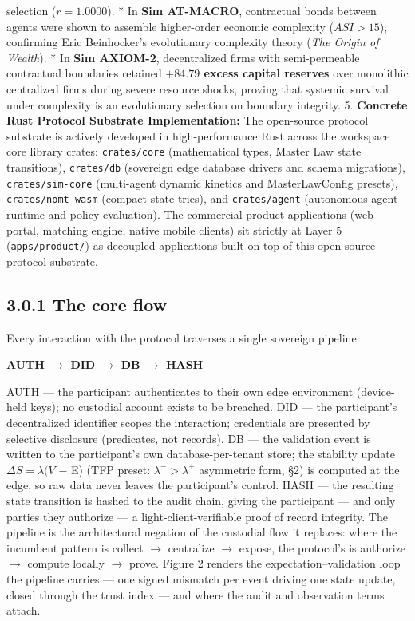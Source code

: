 \documentclass[
]{article}
\begin{document}
selection (\(r = 1.0000\)). * In \textbf{Sim AT-MACRO}, contractual
bonds between agents were shown to assemble higher-order economic
complexity (\(ASI > 15\)), confirming Eric Beinhocker's evolutionary
complexity theory (\emph{The Origin of Wealth}). * In \textbf{Sim
AXIOM-2}, decentralized firms with semi-permeable contractual boundaries
retained \textbf{\(+84.79\) excess capital reserves} over monolithic
centralized firms during severe resource shocks, proving that systemic
survival under complexity is an evolutionary selection on boundary
integrity. 5. \textbf{Concrete Rust Protocol Substrate Implementation:}
The open-source protocol substrate is actively developed in
high-performance Rust across the workspace core library crates:
\texttt{crates/core} (mathematical types, Master Law state transitions),
\texttt{crates/db} (sovereign edge database drivers and schema
migrations), \texttt{crates/sim-core} (multi-agent dynamic kinetics and
MasterLawConfig presets), \texttt{crates/nomt-wasm} (compact state
tries), and \texttt{crates/agent} (autonomous agent runtime and policy
evaluation). The commercial product applications (web portal, matching
engine, native mobile clients) sit strictly at Layer 5
(\texttt{apps/product/}) as decoupled applications built on top of this
open-source protocol substrate.

\subsection{3.0.1 The core flow}\label{the-core-flow}

Every interaction with the protocol traverses a single sovereign
pipeline:

\textbf{AUTH \(\to\) DID \(\to\) DB \(\to\) HASH}

AUTH --- the participant authenticates to their own edge environment
(device-held keys); no custodial account exists to be breached. DID ---
the participant's decentralized identifier scopes the interaction;
credentials are presented by selective disclosure (predicates, not
records). DB --- the validation event is written to the participant's
own database-per-tenant store; the stability update
\(\Delta S = \lambda (V\) \(-\) E) (TFP preset:
\(\lambda^{-} > \lambda^{+}\) asymmetric form, §2) is computed at the
edge, so raw data never leaves the participant's control. HASH --- the
resulting state transition is hashed to the audit chain, giving the
participant --- and only parties they authorize --- a
light-client-verifiable proof of record integrity. The pipeline is the
architectural negation of the custodial flow it replaces: where the
incumbent pattern is collect \(\to\) centralize \(\to\) expose, the
protocol's is authorize \(\to\) compute locally \(\to\) prove. Figure 2
renders the expectation--validation loop the pipeline carries --- one
signed mismatch per event driving one state update, closed through the
trust index --- and where the audit and observation terms attach.
\end{document}
